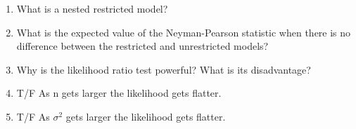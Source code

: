 \documentclass[11pt]{article}
\begin{document}
\begin{enumerate}
\item What is a nested restricted model?  

\item What is the expected value of the Neyman-Pearson statistic when there is no difference between the restricted and unrestricted models?  

\item Why is the likelihood ratio test powerful?  What is its disadvantage?  

\item T/F As n gets larger the likelihood gets flatter. 

\item T/F As $\sigma^2$ gets larger the likelihood gets flatter. 
\end{enumerate}
\end{document}
